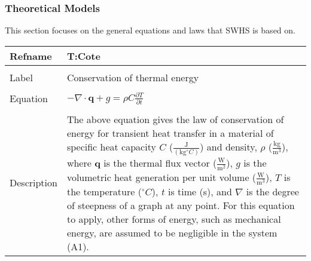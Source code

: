 \documentclass[12pt]{article}
\begin{document}
\subsubsection{Theoretical Models}
\label{Sec:TM}
This section focuses on the general equations and laws that SWHS is based on.
~\newline
\noindent \begin{minipage}{\textwidth}
\begin{tabular}{p{} p{}}
\toprule \textbf{Refname} & \textbf{T:Cote}
\label{T:Cote}
\\ \midrule \\
Label & Conservation of thermal energy
\\ \midrule \\
Equation & $-\nabla{}\cdot{}\mathbf{q}+g=\rho{}C\frac{\partial{}T}{\partial{}t}$
\\ \midrule \\
Description & The above equation gives the law of conservation of energy for transient heat transfer in a material of specific heat capacity $C$ ($\frac{\text{J}}{(\text{kg}{}^{\circ}C)}$) and density, $\rho{}$ ($\frac{\text{kg}}{\text{m}^{3}}$), where $\mathbf{q}$ is the thermal flux vector ($\frac{\text{W}}{\text{m}^{2}}$), $g$ is the volumetric heat generation per unit volume ($\frac{\text{W}}{\text{m}^{3}}$), $T$ is the temperature (${}^{\circ}C$), $t$ is time (s), and $\nabla{}$ is the degree of steepness of a graph at any point. For this equation to apply, other forms of energy, such as mechanical energy, are assumed to be negligible in the system (A1).
\\ \bottomrule \end{tabular}
\end{minipage}\\
~\newline
\end{document}
